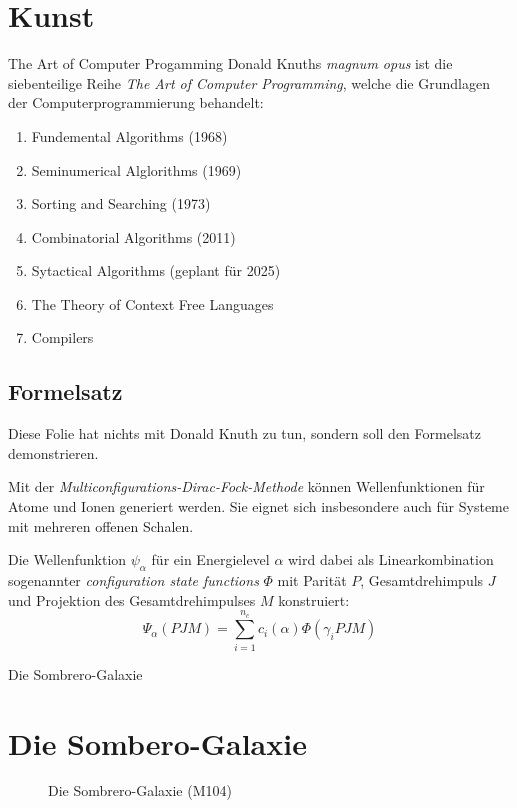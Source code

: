 \documentclass[aspectratio=32]{beamer}
\begin{document}
\section{Kunst}
\begin{frame}{The Art of Computer Progamming}
	Donald Knuths \textit{magnum opus} ist die siebenteilige Reihe \textit{The Art of Computer Programming}, welche die Grundlagen der Computerprogrammierung behandelt:
	\begin{enumerate}[<+->]
		\item Fundemental Algorithms (1968)
		\item Seminumerical Alglorithms (1969)
		\item Sorting and Searching (1973)
		\item Combinatorial Algorithms (2011)
		\item Sytactical Algorithms (geplant für 2025)
		\item The Theory of Context Free Languages
		\item Compilers
		
	\end{enumerate}
\end{frame}

\begin{frame}
\section{Formelsatz}
	Diese Folie hat nichts mit Donald Knuth zu tun, sondern soll den Formelsatz demonstrieren.
	\par
	Mit der \textit{Multiconfigurations-Dirac-Fock-Methode} können Wellenfunktionen für Atome und Ionen generiert werden. Sie eignet sich insbesondere auch für Systeme mit mehreren offenen Schalen. \par
	
	Die Wellenfunktion $\psi_{\alpha}$ für ein Energielevel $\alpha$ wird dabei als Linearkombination sogenannter \textit{configuration state functions} $\Phi$ mit Parität $P$, Gesamtdrehimpuls $J$ und Projektion des Gesamtdrehimpulses $M$ konstruiert:
	\[
	\Psi_{\alpha}(PJM)=\sum_{i=1}^{n_{c}}c_i(\alpha)\Phi(\gamma_iPJM)
	\]
\end{frame}

\begin{frame}{Die Sombrero-Galaxie}
\section{Die Sombero-Galaxie}
	\begin{figure}
	\centering
	\caption{Die Sombrero-Galaxie (M104)}
		
	\end{figure}
\end{frame}
\end{document}
